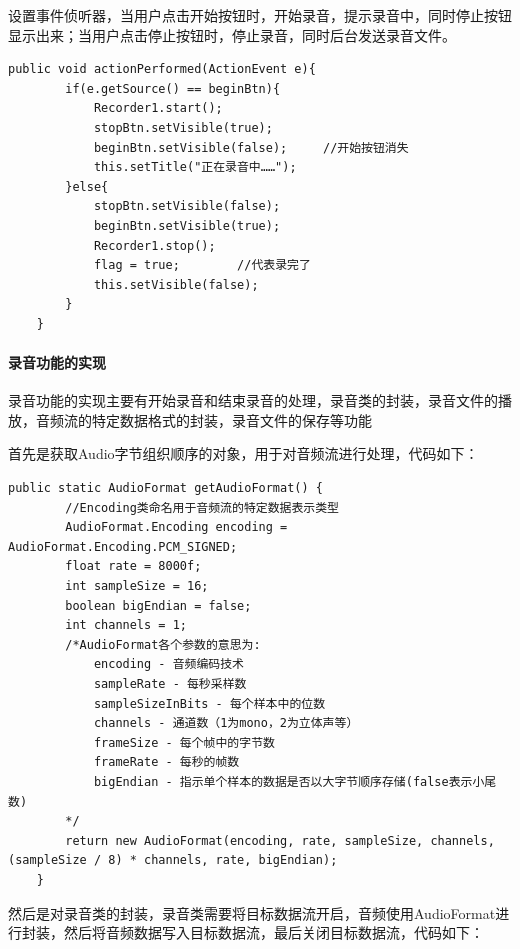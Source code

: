 \documentclass[UTF8,12pt]{article}
\begin{document}
设置事件侦听器，当用户点击开始按钮时，开始录音，提示录音中，同时停止按钮显示出来；当用户点击停止按钮时，停止录音，同时后台发送录音文件。

\begin{lstlisting}[title=录音界面的事件侦听器,frame=shadowbox]
    public void actionPerformed(ActionEvent e){
        if(e.getSource() == beginBtn){
            Recorder1.start();
            stopBtn.setVisible(true);
            beginBtn.setVisible(false);     //开始按钮消失
            this.setTitle("正在录音中……");
        }else{
            stopBtn.setVisible(false);
            beginBtn.setVisible(true);
            Recorder1.stop();
            flag = true;        //代表录完了
            this.setVisible(false);
        }
    }
\end{lstlisting}

\paragraph{录音功能的实现}
录音功能的实现主要有开始录音和结束录音的处理，录音类的封装，录音文件的播放，音频流的特定数据格式的封装，录音文件的保存等功能

首先是获取Audio字节组织顺序的对象，用于对音频流进行处理，代码如下：
\begin{lstlisting}[title=获取Audio字节组织顺序的对象,frame=shadowbox]
    public static AudioFormat getAudioFormat() {
        //Encoding类命名用于音频流的特定数据表示类型
        AudioFormat.Encoding encoding = AudioFormat.Encoding.PCM_SIGNED;
        float rate = 8000f;
        int sampleSize = 16;
        boolean bigEndian = false;
        int channels = 1;
        /*AudioFormat各个参数的意思为:
            encoding - 音频编码技术
            sampleRate - 每秒采样数
            sampleSizeInBits - 每个样本中的位数
            channels - 通道数（1为mono，2为立体声等）
            frameSize - 每个帧中的字节数
            frameRate - 每秒的帧数
            bigEndian - 指示单个样本的数据是否以大字节顺序存储(false表示小尾数)
        */
        return new AudioFormat(encoding, rate, sampleSize, channels, (sampleSize / 8) * channels, rate, bigEndian);
    }
\end{lstlisting}

然后是对录音类的封装，录音类需要将目标数据流开启，音频使用AudioFormat进行封装，然后将音频数据写入目标数据流，最后关闭目标数据流，代码如下：
\end{document}
